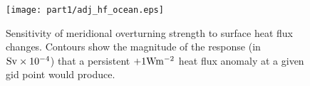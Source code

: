 \begin{figure}
  \begin{center}
   \texttt{[image: part1/adj\_hf\_ocean.eps]}
  \end{center}
\caption{Sensitivity of meridional overturning strength to surface heat flux
changes. Contours show the magnitude of the response (in ${\rm Sv }\times 10^{-4}$) that a persistent
$+1{\rm W}{\rm m}^{-2}$ heat flux anomaly at a given gid point would
produce.}
\label{fig:hf-sensitivity}
\end{figure}
